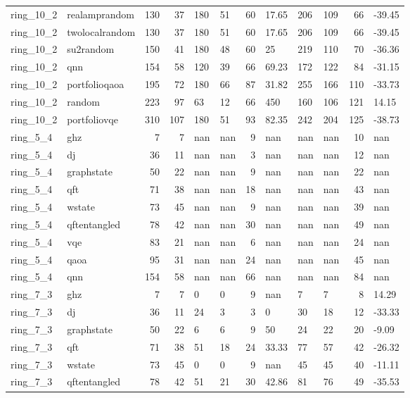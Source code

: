 \begin{longtable}{llrrllrlllrl}
ring\_10\_2 & realamprandom & 130 & 37 & 180 & 51 & 60 & 17.65 & 206 & 109 & 66 & -39.45 \\
ring\_10\_2 & twolocalrandom & 130 & 37 & 180 & 51 & 60 & 17.65 & 206 & 109 & 66 & -39.45 \\
ring\_10\_2 & su2random & 150 & 41 & 180 & 48 & 60 & 25 & 219 & 110 & 70 & -36.36 \\
ring\_10\_2 & qnn & 154 & 58 & 120 & 39 & 66 & 69.23 & 172 & 122 & 84 & -31.15 \\
ring\_10\_2 & portfolioqaoa & 195 & 72 & 180 & 66 & 87 & 31.82 & 255 & 166 & 110 & -33.73 \\
ring\_10\_2 & random & 223 & 97 & 63 & 12 & 66 & 450 & 160 & 106 & 121 & 14.15 \\
ring\_10\_2 & portfoliovqe & 310 & 107 & 180 & 51 & 93 & 82.35 & 242 & 204 & 125 & -38.73 \\
ring\_5\_4 & ghz & 7 & 7 & nan & nan & 9 & nan & nan & nan & 10 & nan \\
ring\_5\_4 & dj & 36 & 11 & nan & nan & 3 & nan & nan & nan & 12 & nan \\
ring\_5\_4 & graphstate & 50 & 22 & nan & nan & 9 & nan & nan & nan & 22 & nan \\
ring\_5\_4 & qft & 71 & 38 & nan & nan & 18 & nan & nan & nan & 43 & nan \\
ring\_5\_4 & wstate & 73 & 45 & nan & nan & 9 & nan & nan & nan & 39 & nan \\
ring\_5\_4 & qftentangled & 78 & 42 & nan & nan & 30 & nan & nan & nan & 49 & nan \\
ring\_5\_4 & vqe & 83 & 21 & nan & nan & 6 & nan & nan & nan & 24 & nan \\
ring\_5\_4 & qaoa & 95 & 31 & nan & nan & 24 & nan & nan & nan & 45 & nan \\
ring\_5\_4 & qnn & 154 & 58 & nan & nan & 66 & nan & nan & nan & 84 & nan \\
ring\_7\_3 & ghz & 7 & 7 & 0 & 0 & 9 & nan & 7 & 7 & 8 & 14.29 \\
ring\_7\_3 & dj & 36 & 11 & 24 & 3 & 3 & 0 & 30 & 18 & 12 & -33.33 \\
ring\_7\_3 & graphstate & 50 & 22 & 6 & 6 & 9 & 50 & 24 & 22 & 20 & -9.09 \\
ring\_7\_3 & qft & 71 & 38 & 51 & 18 & 24 & 33.33 & 77 & 57 & 42 & -26.32 \\
ring\_7\_3 & wstate & 73 & 45 & 0 & 0 & 9 & nan & 45 & 45 & 40 & -11.11 \\
ring\_7\_3 & qftentangled & 78 & 42 & 51 & 21 & 30 & 42.86 & 81 & 76 & 49 & -35.53 \\

\end{longtable}

